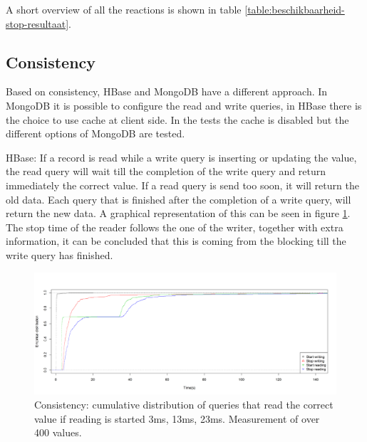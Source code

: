 \documentclass[10pt,conference,letterpaper]{IEEEtran}
\begin{document}
A short overview of all the reactions is shown in table \ref{table:beschikbaarheid-stop-resultaat}. 
\begin{table}[htbp]
  \centering
    \caption{Availability: Overview of different reaction when stopping an instance }
  \label{table:beschikbaarheid-stop-resultaat}%
\end{table}

\subsection{Consistency}
Based on consistency, HBase and MongoDB have a different approach. In MongoDB it is possible to configure the read and write queries, in HBase there is the choice to use cache at client side. In the tests the cache is disabled but the different options of MongoDB are tested. 

HBase: If a record is read while a write query is inserting or updating the value, the read query will wait till the completion of the write query and return immediately the correct value. If a read query is send too soon, it will return the old data. Each query that is finished after the completion of a write query, will return the new data. A graphical representation of this can be seen in figure \ref{fig:consistentie-hbase-voorbeeld}. The stop time of the reader follows the one of the writer, together with extra information, it can be concluded that this is coming from the blocking till the write query has finished. 

\begin{figure}[h]
\centering
\includegraphics[width=\linewidth]{img/HBase/ECDF-plot-R-1-insertRawData-5}
\caption{Consistency: cumulative distribution of queries that read the correct value if reading is started 3ms, 13ms, 23ms. Measurement of over 400 values.}
\label{fig:consistentie-hbase-voorbeeld}
\end{figure}
\end{document}
